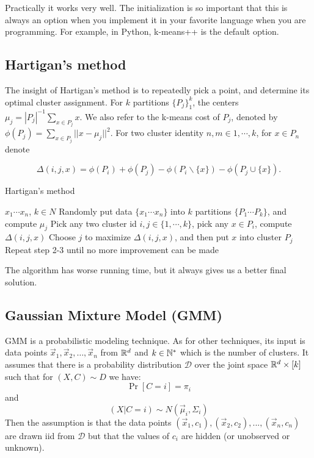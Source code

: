 Practically it works very well. The initialization is so important that this is always an option when you implement it in your favorite language when you are programming. For example, in Python, k-means++ is the default option. 
	
\subsection{Hartigan's method}

The insight of Hartigan's method is to repeatedly pick a point, and determine its optimal cluster assignment. For $k$ partitions $\{P_j\}_1^k$, the centers $\mu_j = |P_j|^{-1} \sum_{x \in P_j}x$. We also refer to the k-means cost of $P_j$, denoted by $\phi(P_j) = \sum_{x \in P_j} ||x-\mu_j||^2$. For two cluster identity $n, m \in {1,\cdots,k}$, for $x \in P_n$ denote

$$\Delta (i,j,x) = \phi(P_i) + \phi(P_j) - \phi(P_i \backslash \{x\}) - \phi(P_j \cup \{x\}).$$

\begin{algorithm}[H]
  \caption{Hartigan's method}
  \label{ladder-mechanism}
  \begin{algorithmic}[1]
    \renewcommand\algorithmicrequire{\textbf{input}} 
    \REQUIRE ${x_1\cdots x_n}$, $k\in N$
    \STATE Randomly put data $\{x_1\cdots x_n\}$ into $k$ partitions $\{P_1\cdots P_k\}$, and compute ${\mu_j}$
    \STATE Pick any two cluster id $i,j \in \{1,\cdots,k\}$, pick any $x \in P_i$, compute $\Delta(i,j,x)$
    \STATE Choose $j$ to maximize $\Delta(i,j,x)$, and then put $x$ into cluster $P_j$
    \STATE Repeat step 2-3 until no more improvement can be made
  \end{algorithmic}
\end{algorithm}

The algorithm has worse running time, but it always gives us a better final solution.

\subsection{Gaussian Mixture Model (GMM)}
  GMM is a probabilistic modeling technique. As for other techniques, its input is data points $\vec{x}_1, \vec{x}_2, \dots, \vec{x}_n$ from $\mathbb{R}^d$ and $k \in \mathbb{N}^*$ which 
  is the number of clusters.
  It assumes that there is a probability distribution $\mathcal{D}$ over the joint space $\mathbb{R}^d \times [k]$ such that for $(X, C) \sim D$ we have:
  $$\Pr[C = i] = \pi_i$$
  and 
  $$(X | C = i) \sim N(\vec{\mu}_i, \Sigma_i) $$
  Then the assumption is that the data points $(\vec{x}_1, c_1), (\vec{x}_2, c_2), ..., (\vec{x}_n, c_n)$ are drawn iid from $\mathcal{D}$ but
  that the values of $c_i$ are hidden (or unobserved or unknown).
  
